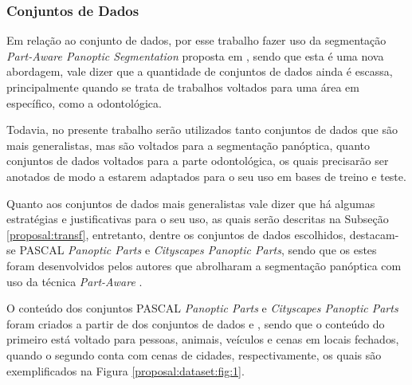 \subsubsection{Conjuntos de Dados}
\label{proposal:dataset}
Em relação ao conjunto de dados, por esse trabalho fazer uso da segmentação \textit{Part-Aware Panoptic Segmentation} proposta em \cite{DeGeus2021}, sendo que esta é uma nova abordagem, vale dizer que a quantidade de conjuntos de dados ainda é escassa, principalmente quando se trata de trabalhos voltados para uma área em específico, como a odontológica.

Todavia, no presente trabalho serão utilizados tanto conjuntos de dados que são mais generalistas, mas são voltados para a segmentação panóptica, quanto conjuntos de dados voltados para a parte odontológica, os quais precisarão ser anotados de modo a estarem adaptados para o seu uso em bases de treino e teste.

Quanto aos conjuntos de dados mais generalistas vale dizer que há algumas estratégias e justificativas para o seu uso, as quais serão descritas na Subseção \ref{proposal:transf}, entretanto, dentre os conjuntos de dados escolhidos, destacam-se PASCAL \textit{Panoptic Parts} e \textit{Cityscapes Panoptic Parts}, sendo que os estes foram desenvolvidos pelos autores que abrolharam a segmentação panóptica com uso da técnica \textit{Part-Aware} \cite{DeGeus2021}.

O conteúdo dos conjuntos PASCAL \textit{Panoptic Parts} e \textit{Cityscapes Panoptic Parts} foram criados a partir de dos conjuntos de dados \cite{everingham2010pascal} e \cite{Cordts2016}, sendo que o conteúdo do primeiro está voltado para pessoas, animais, veículos e cenas em locais fechados, quando o segundo conta com cenas de cidades, respectivamente, os quais são exemplificados na Figura \ref{proposal:dataset:fig:1}.

